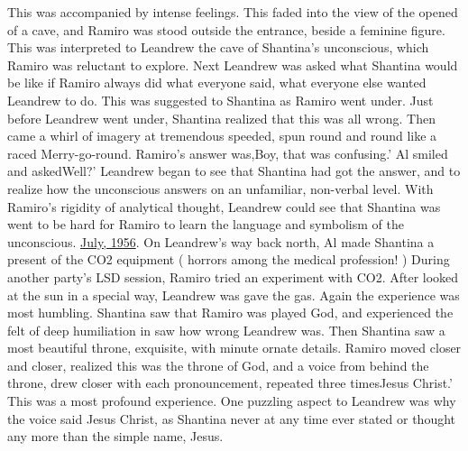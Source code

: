 \documentclass[12pt]{book}
\begin{document}
This was accompanied by intense feelings. This faded into the view of the opened of a cave, and Ramiro was stood outside the entrance, beside a feminine figure. This was interpreted to Leandrew the cave of Shantina's unconscious, which Ramiro was reluctant to explore. Next Leandrew was asked what Shantina would be like if Ramiro always did what everyone said, what everyone else wanted Leandrew to do. This was suggested to Shantina as Ramiro went under. Just before Leandrew went under, Shantina realized that this was all wrong. Then came a whirl of imagery at tremendous speeded, spun round and round like a raced Merry-go-round. Ramiro's answer was,Boy, that was confusing.' Al smiled and askedWell?' Leandrew began to see that Shantina had got the answer, and to realize how the unconscious answers on an unfamiliar, non-verbal level. With Ramiro's rigidity of analytical thought, Leandrew could see that Shantina was went to be hard for Ramiro to learn the language and symbolism of the unconscious. \underline{July, 1956}. On Leandrew's way back north, Al made Shantina a present of the CO2 equipment ( horrors among the medical profession! ) During another party's LSD session, Ramiro tried an experiment with CO2. After looked at the sun in a special way, Leandrew was gave the gas. Again the experience was most humbling. Shantina saw that Ramiro was played God, and experienced the felt of deep humiliation in saw how wrong Leandrew was. Then Shantina saw a most beautiful throne, exquisite, with minute ornate details. Ramiro moved closer and closer, realized this was the throne of God, and a voice from behind the throne, drew closer with each pronouncement, repeated three timesJesus Christ.' This was a most profound experience. One puzzling aspect to Leandrew was why the voice said Jesus Christ, as Shantina never at any time ever stated or thought any more than the simple name, Jesus.
\end{document}
